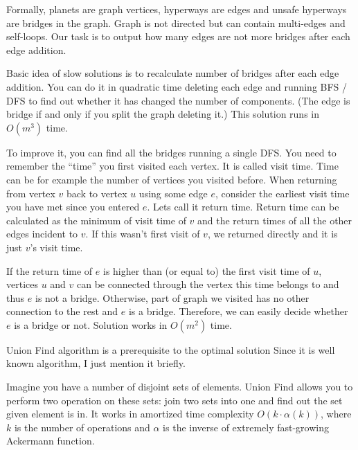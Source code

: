 

Formally, planets are graph vertices, hyperways are edges and unsafe hyperways
are bridges in the graph. Graph is not directed but can contain multi-edges and
self-loops. Our task is to output how many edges are not more bridges after
each edge addition.


Basic idea of slow solutions is to recalculate number of bridges after each
edge addition. You can do it in quadratic time deleting each edge and running
BFS / DFS to find out whether it has changed the number of components.
(The edge is bridge if and only if you split the graph deleting it.)
This solution runs in $O(m^3)$ time.

To improve it, you can find all the bridges running a single DFS. You need to
remember the ``time'' you first visited each vertex. It is called visit time.
Time can be for example the number of vertices you visited before.
When returning from
vertex $v$ back to vertex $u$ using some edge $e$,
consider the earliest visit time you have met since you entered $e$.
Lets call it return time. Return time can be calculated
as the minimum of visit time of $v$ and the return times
of all the other edges incident to $v$. If this wasn't first visit of
$v$, we returned directly and it is just $v$'s visit time.

If the return time of $e$ is higher than (or equal to) the first visit time
of $u$, vertices $u$ and $v$ can be connected through the vertex this
time belongs to and thus $e$ is not a bridge.
Otherwise, part of graph we visited has no other connection to the rest
and $e$ is a bridge. Therefore, we can easily decide whether $e$ is a bridge
or not. Solution works in $O(m^2)$ time.


Union Find algorithm is a prerequisite to the optimal solution
Since it is well known algorithm, I just mention it briefly.

Imagine you have a number of disjoint sets of elements.
Union Find allows you to perform two operation on these sets:
join two sets into one and find out the set given element is in.
It works in amortized time complexity $O(k\cdot \alpha(k))$,
where $k$ is the number of operations and $\alpha$ is the inverse
of extremely fast-growing Ackermann function.

